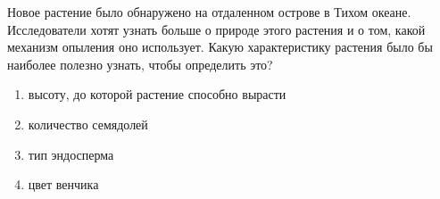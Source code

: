 
Новое растение было обнаружено на
отдаленном острове в Тихом океане. Исследователи хотят узнать больше о природе
этого растения и о том, какой механизм опыления оно использует. Какую
характеристику растения было бы наиболее полезно узнать, чтобы определить это?

\begin{enumerate}
    \item высоту, до которой растение способно вырасти 
    \item количество семядолей   
    \item тип эндосперма  
    \item цвет венчика
\end{enumerate}

\explanationSection

